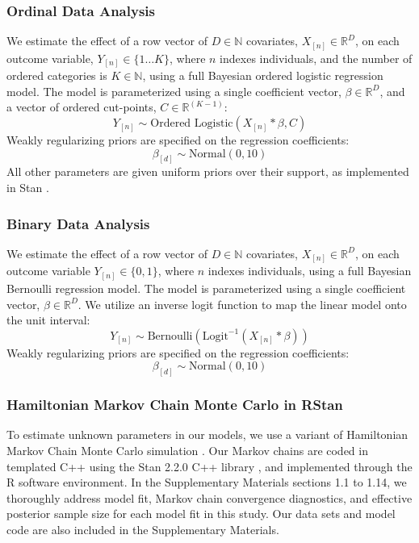 \documentclass[12pt]{article}
\begin{document}
\subsubsection{Ordinal Data Analysis}
We estimate the effect of a row vector of $D\in\mathbb{N}$ covariates, $X_{[n]}\in \mathbb{R}^D$, on each outcome variable, $Y_{[n]}\in\{1\dots K\}$, where $n$ indexes individuals, and the number of ordered categories is $K\in \mathbb{N}$, using a full Bayesian ordered logistic regression model. The model is parameterized using a single coefficient vector, $\beta \in \mathbb{R}^D$, and a vector of ordered cut-points, $C \in \mathbb{R}^{(K-1)}$:
\begin{equation}
Y_{[n]} \sim \text{Ordered Logistic}( X_{[n]} * \beta ,C)
\end{equation}
Weakly regularizing priors are specified on the regression coefficients:
\begin{equation}
\beta_{[d]} \sim \text{Normal}(0,10)
\end{equation}
All other parameters are given uniform priors over their support, as implemented in Stan \citep{stan-manual:2013}.
 
\subsubsection{Binary Data Analysis}
We estimate the effect of a row vector of $D\in\mathbb{N}$ covariates, $X_{[n]}\in \mathbb{R}^D$, on each outcome variable $Y_{[n]}\in\{0,1\}$, where $n$ indexes individuals, using a full Bayesian Bernoulli regression model. The model is parameterized using a single coefficient vector, $\beta \in \mathbb{R}^D$. We utilize an inverse logit function to map the linear model onto the unit interval: 
\begin{equation}
Y_{[n]} \sim \text{Bernoulli}( \text{Logit}^{-1}(X_{[n]} * \beta))
\end{equation}
Weakly regularizing priors are specified on the regression coefficients:
\begin{equation}
\beta_{[d]} \sim \text{Normal}(0,10)
\end{equation}

\subsubsection{Hamiltonian Markov Chain Monte Carlo in RStan}
To estimate unknown parameters in our models, we use a variant of Hamiltonian Markov Chain Monte Carlo simulation \citep{hoffman-gelman:2012}. Our Markov chains are coded in templated C++ using the Stan 2.2.0 C++ library \citep{stan-software:2013}, and implemented through the R software environment. In the Supplementary Materials sections 1.1 to 1.14, we thoroughly address model fit, Markov chain convergence diagnostics, and effective posterior sample size for each model fit in this study.  Our data sets and model code are also included in the Supplementary Materials.
\end{document}
